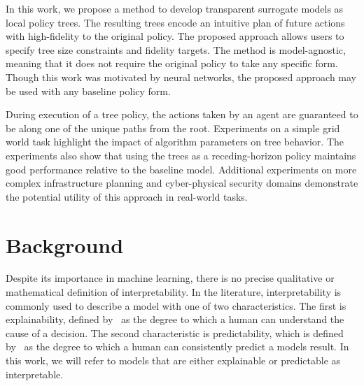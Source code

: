 \documentclass[letterpaper]{article} %
\begin{document}
In this work, we propose a method to develop transparent surrogate models as local policy trees.
The resulting trees encode an intuitive plan of future actions with high-fidelity to the original policy.
The proposed approach allows users to specify tree size constraints and fidelity targets.
The method is model-agnostic, meaning that it does not require the original policy to take any specific form.
Though this work was motivated by neural networks, the proposed approach may be used
with any baseline policy form.

During execution of a tree policy, the actions taken by an agent are guaranteed to be along one of the unique paths from the root.
Experiments on a simple grid world task highlight the impact of algorithm parameters on tree behavior.
The experiments also show that using the trees as a receding-horizon policy maintains good performance relative to the baseline model.
Additional experiments on more complex infrastructure planning and cyber-physical security domains demonstrate the potential utility of this approach in real-world tasks.
\section{Background}
Despite its importance in machine learning, there is no precise qualitative or mathematical definition of interpretability.
In the literature, interpretability is commonly used to describe a model with one of two characteristics.
The first is explainability, defined by~\citet{miller2019} as the degree to which a human can understand the cause of a decision.
The second characteristic is predictability, which is defined by~\citet{kim2016} as the degree to which a human can consistently predict a models result.
In this work, we will refer to models that are either explainable or predictable as interpretable.
\end{document}
